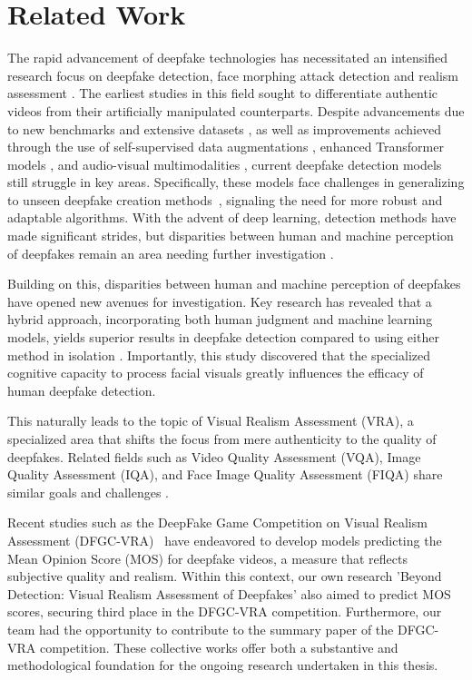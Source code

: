 \documentclass[a4paper,12pt,openright]{book}
\begin{document}
\chapter{Related Work}
\label{chap:related_work}
The rapid advancement of deepfake technologies has necessitated an intensified research focus on deepfake detection, face morphing attack detection and realism assessment \cite{DBLP:journals/corr/abs-2103-00484, ivanovska2022face}. The earliest studies in this field sought to differentiate authentic videos from their artificially manipulated counterparts. Despite advancements due to new benchmarks and extensive datasets \cite{khalid2022fakeavceleb, DBLP:journals/corr/abs-2103-16076}, as well as improvements achieved through the use of self-supervised data augmentations \cite{shiohara2022detecting}, enhanced Transformer models \cite{ISTVT}, and audio-visual multimodalities \cite{AVoiD}, current deepfake detection models still struggle in key areas. Specifically, these models face challenges in generalizing to unseen deepfake creation methods~\cite{li2023generalizable}, signaling the need for more robust and adaptable algorithms.
With the advent of deep learning, detection methods have made significant strides, but disparities between human and machine perception of deepfakes remain an area needing further investigation \cite{DBLP:journals/corr/abs-2009-03155}.

Building on this, disparities between human and machine perception of deepfakes have opened new avenues for investigation. Key research has revealed that a hybrid approach, incorporating both human judgment and machine learning models, yields superior results in deepfake detection compared to using either method in isolation \cite{DBLP:journals/corr/abs-2105-06496}. Importantly, this study discovered that the specialized cognitive capacity to process facial visuals greatly influences the efficacy of human deepfake detection.

This naturally leads to the topic of Visual Realism Assessment (VRA), a specialized area that shifts the focus from mere authenticity to the quality of deepfakes. Related fields such as Video Quality Assessment (VQA), Image Quality Assessment (IQA), and Face Image Quality Assessment (FIQA) share similar goals and challenges \cite{babnik2023diffiqa, DBLP:journals/corr/abs-2201-11975,zhao2023zoomvqa}.

Recent studies such as the DeepFake Game Competition on Visual Realism Assessment (DFGC-VRA)~\cite{peng_etal_2023} have endeavored to develop models predicting the Mean Opinion Score (MOS) for deepfake videos, a measure that reflects subjective quality and realism. Within this context, our own research 'Beyond Detection: Visual Realism Assessment of Deepfakes' \cite{dragar2023detection} also aimed to predict MOS scores, securing third place in the DFGC-VRA competition. Furthermore, our team had the opportunity to contribute to the summary paper of the DFGC-VRA competition. These collective works offer both a substantive and methodological foundation for the ongoing research undertaken in this thesis.
\end{document}
